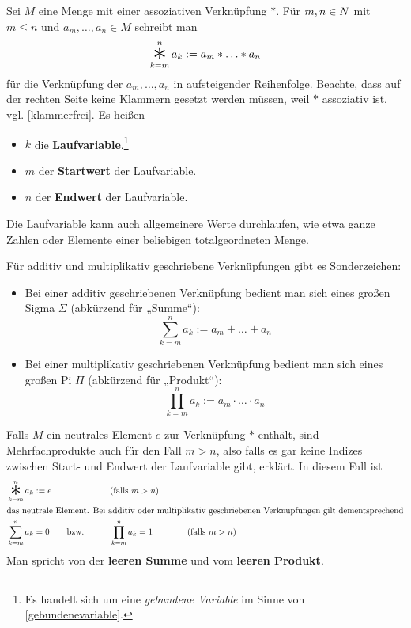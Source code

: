 \begin{nota}[Mehrfachprodukte] \label{mehrfachprodukt}  
    Sei $M$ eine Menge mit einer assoziativen Verknüpfung $*$. Für $m,n\in \relax N$ mit $m\le n$ und $a_m,\dots , a_n\in M$ schreibt man
        \[ \mathop{\raisebox{-0.6ex}{\scalebox{2.5}{$*$}}}_{k=m}^n a_k := a_m * \ldots * a_n \]
    für die Verknüpfung der $a_m,\dots , a_n$ in aufsteigender Reihenfolge. Beachte, dass auf der rechten Seite keine Klammern gesetzt werden müssen, weil $*$ assoziativ ist, vgl. \cref{klammerfrei}. Es heißen
    \begin{itemize}
        \item $k$ die \textbf{Laufvariable}.\footnote{Es handelt sich um eine \emph{gebundene Variable} im Sinne von \cref{gebundenevariable}.}
        \item $m$ der \textbf{Startwert} der Laufvariable.
        \item $n$ der \textbf{Endwert} der Laufvariable.
    \end{itemize}
    Die Laufvariable kann auch allgemeinere Werte durchlaufen, wie etwa ganze Zahlen oder Elemente einer beliebigen totalgeordneten Menge.
    
    Für additiv und multiplikativ geschriebene Verknüpfungen gibt es Sonderzeichen:
    \begin{itemize}
        \item Bei einer additiv geschriebenen Verknüpfung bedient man sich eines großen Sigma $\Sigma$ (abkürzend für „Summe“):
            \[ \sum_{k=m}^n a_k := a_m + \ldots + a_n \]
        \item Bei einer multiplikativ geschriebenen Verknüpfung bedient man sich eines großen Pi $\Pi$ (abkürzend für „Produkt“):
            \[ \prod_{k=m}^n a_k := a_m \cdot \ldots \cdot a_n \]
    \end{itemize}
    Falls $M$ ein neutrales Element $e$ zur Verknüpfung $*$ enthält, sind Mehrfachprodukte auch für den Fall $m>n$, also falls es gar keine Indizes zwischen Start- und Endwert der Laufvariable gibt, erklärt. In diesem Fall ist
    \begin{alignat*}{2}
        & \mathop{\raisebox{-0.6ex}{\scalebox{2.5}{$*$}}}_{k=m}^n a_k := e && (\text{falls $m>n$}) \\
        \intertext{das neutrale Element. Bei additiv oder multiplikativ geschriebenen Verknüpfungen gilt dementsprechend}
        & \sum_{k=m}^n a_k = 0 \qquad\text{bzw.}\qquad && \prod_{k=m}^n a_k = 1 \qquad\qquad (\text{falls $m>n$})
    \end{alignat*}
    Man spricht von der \textbf{leeren Summe} und vom \textbf{leeren Produkt}.
    

\end{nota}
